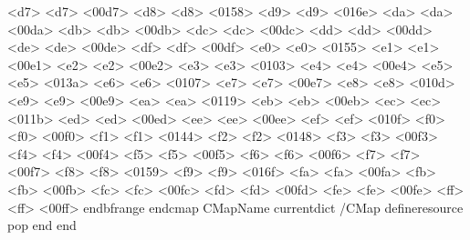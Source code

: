       <d7> <d7> <00d7> %
      <d8> <d8> <0158> %
      <d9> <d9> <016e> %
      <da> <da> <00da> %
      <db> <db> <00db> %
      <dc> <dc> <00dc> %
      <dd> <dd> <00dd> %
      <de> <de> <00de> %
      <df> <df> <00df> %
      <e0> <e0> <0155> %
      <e1> <e1> <00e1> %
      <e2> <e2> <00e2> %
      <e3> <e3> <0103> %
      <e4> <e4> <00e4> %
      <e5> <e5> <013a> %
      <e6> <e6> <0107> %
      <e7> <e7> <00e7> %
      <e8> <e8> <010d> %
      <e9> <e9> <00e9> %
      <ea> <ea> <0119> %
      <eb> <eb> <00eb> %
      <ec> <ec> <011b> %
      <ed> <ed> <00ed> %
      <ee> <ee> <00ee> %
      <ef> <ef> <010f> %
      <f0> <f0> <00f0> %
      <f1> <f1> <0144> %
      <f2> <f2> <0148> %
      <f3> <f3> <00f3> %
      <f4> <f4> <00f4> %
      <f5> <f5> <00f5> %
      <f6> <f6> <00f6> %
      <f7> <f7> <00f7> %
      <f8> <f8> <0159> %
      <f9> <f9> <016f> %
      <fa> <fa> <00fa> %
      <fb> <fb> <00fb> %
      <fc> <fc> <00fc> %
      <fd> <fd> <00fd> %
      <fe> <fe> <00fe> %
      <ff> <ff> <00ff> %
    endbfrange
  endcmap
CMapName currentdict /CMap defineresource pop end
end
\stoppdffontresource

\endinput
